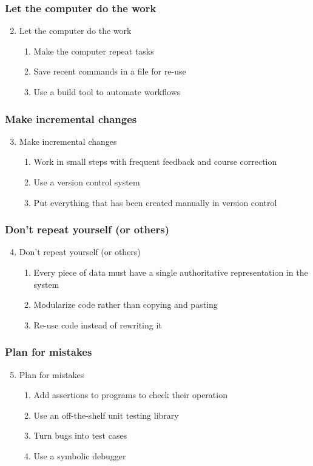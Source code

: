 \documentclass{beamer}
\begin{document}
\begin{frame}
	\frametitle{Let the computer do the work}
	\begin{enumerate}
	\setcounter{enumi}{1}
	\item Let the computer do the work
		\begin{enumerate}
		\item Make the computer repeat tasks
		\item Save recent commands in a file for re-use
		\item Use a build tool to automate workflows
		\end{enumerate}
	\end{enumerate}
\end{frame}

\begin{frame}
	\frametitle{Make incremental changes}
	\begin{enumerate}
		\setcounter{enumi}{2}
		\item Make incremental changes
		\begin{enumerate}
			\item Work in small steps with frequent feedback and course 
			correction
			\item Use a version control system
			\item Put everything that has been created manually in version 
			control
		\end{enumerate}
	\end{enumerate}
\end{frame}

\begin{frame}
	\frametitle{Don’t repeat yourself (or others)}
	\begin{enumerate}
		\setcounter{enumi}{3}
		\item Don’t repeat yourself (or others)
		\begin{enumerate}
			\item Every piece of data must have a single authoritative 
			representation in the system
			\item Modularize code rather than copying and pasting
			\item Re-use code instead of rewriting it 
		\end{enumerate}
	\end{enumerate}
\end{frame}

\begin{frame}
	\frametitle{Plan for mistakes}
	\begin{enumerate}
		\setcounter{enumi}{4}
		\item Plan for mistakes
		\begin{enumerate}
			\item Add assertions to programs to check their operation
			\item Use an off-the-shelf unit testing library
			\item Turn bugs into test cases
			\item Use a symbolic debugger
		\end{enumerate}
	\end{enumerate}
\end{frame}
\end{document}
